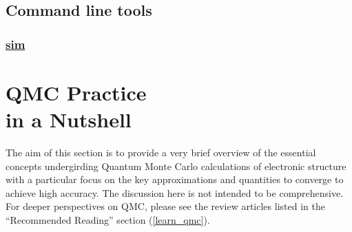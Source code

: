 \documentclass[oneside,11pt]{memoir}
\numberwithin{equation}{section}
\newcommand{\bu}[1]{\textbf{\underline{#1}}}
\begin{document}
\section{Command line tools}
\subsection{\bu{sim}}






\pagebreak
\chapter{QMC Practice \\in a Nutshell}\label{theory}
The aim of this section is to provide a very brief overview of the 
essential concepts undergirding Quantum Monte Carlo calculations 
of electronic structure with a particular focus on the key 
approximations and quantities to converge to achieve high
accuracy.  The discussion here is not intended to be comprehensive. 
For deeper perspectives on QMC, please see the review articles 
listed in the ``Recommended Reading'' section (\ref{learn_qmc}).
\end{document}
